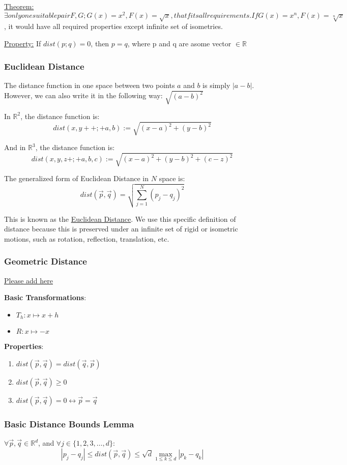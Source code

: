 \underline{Theorem:} $\exists only one suitable pair F, G; G(x) = x^2, F(x) = \sqrt{x}, that fits all requirements. If G(x) = x^n, F(x) = \sqrt[n]{x}$, it would have all required properties except infinite set of isometries.

\underline{Property:} If $dist(p; q) = 0$, then $p = q$, where p and q are asome vector $\in \mathbb{R}$

\subsubsection{Euclidean Distance}
The distance function in one space between two points $a$ and $b$ is simply $|a
- b|$. However, we can also write it in the following way: $\sqrt{(a - b)^2}$

In $\mathbb{R}^2$, the distance function is:
$$dist(x, y++;+a,b) := \sqrt{(x - a)^2 + (y - b)^2}$$

And in $\mathbb{R}^3$, the distance function is:
$$dist(x, y, z+;+ a,b,c) := \sqrt{(x - a)^2 + (y - b)^2 + (c - z)^2}$$

The generalized form of Euclidean Distance in $N$ space is:
$$dist(\vec{p}, \vec{q}) = \sqrt{\sum_{j = 1}^N (p_j - q_j)^2}$$

This is known as the \underline{Euclidean Distance}. We use this specific
definition of distance because this is preserved under an infinite set of rigid
or isometric motions, such as rotation, reflection, translation, etc.

\subsubsection{Geometric Distance}
\underline{Please add here}

\textbf{Basic Transformations}:
\begin{itemize}
\item $T_h : x \mapsto x+h$
\item $R: x \mapsto -x$
\end{itemize}

\textbf{Properties}:
\begin{enumerate}
\item $dist(\vec{p}, \vec{q}) = dist(\vec{q}, \vec{p})$
\item $dist(\vec{p}, \vec{q}) \geq 0$
\item $dist(\vec{p}, \vec{q}) = 0 \leftrightarrow \vec{p} = \vec{q}$
\end{enumerate}

\subsubsection{Basic Distance Bounds Lemma}
$\forall \vec{p}, \vec{q} \in
\mathbb{R}^d$, and $\forall j \in \{1,2,3,\dots,d\}$:
$$|p_j - q_j| \leq dist(\vec{p}, \vec{q}) \leq \sqrt{d} \max_{1 \leq k \leq
d} |p_k - q_k|$$

